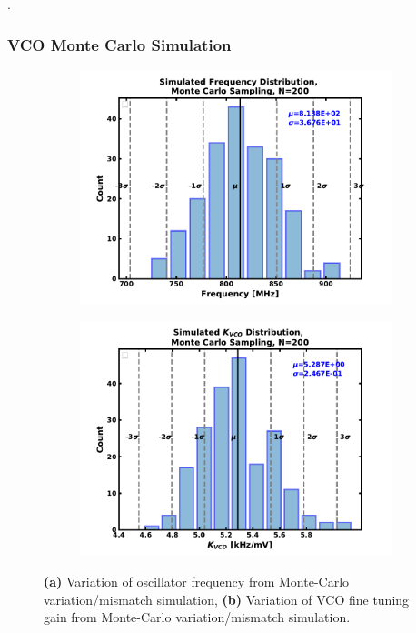 {\color{white}.}\FloatBarrier
	\subsubsection{VCO Monte Carlo Simulation}

	\begin{figure}[htb!]
	    \centering
	    \begin{subfigure}{0.5\textwidth}
	        \centering
	        \includegraphics[width=1\textwidth, angle=0]{./figs/results/freq_hist_final}
	        \caption{ }
	        \label{fig:freq_variation}
	    \end{subfigure}%
	    \begin{subfigure}{0.5\textwidth}
	        \centering
	        \includegraphics[width=1\textwidth, angle=0]{./figs/results/kvco_hist_final}
	        \caption{ }
	        \label{fig:kvco_variation}
	    \end{subfigure}
	    \caption{\textbf{(a)} Variation of oscillator frequency from Monte-Carlo variation/mismatch simulation, \textbf{(b)} Variation of VCO fine tuning gain from Monte-Carlo variation/mismatch simulation.}
	    \label{fig:mc_sim_results}
	\end{figure} 
